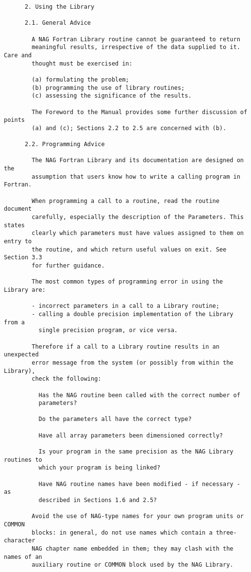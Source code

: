 \begin{small}
\begin{verbatim}
      2. Using the Library

      2.1. General Advice

        A NAG Fortran Library routine cannot be guaranteed to return
        meaningful results, irrespective of the data supplied to it. Care and
        thought must be exercised in:

        (a) formulating the problem;
        (b) programming the use of library routines;
        (c) assessing the significance of the results.

        The Foreword to the Manual provides some further discussion of points
        (a) and (c); Sections 2.2 to 2.5 are concerned with (b).

      2.2. Programming Advice

        The NAG Fortran Library and its documentation are designed on the
        assumption that users know how to write a calling program in Fortran.

        When programming a call to a routine, read the routine document
        carefully, especially the description of the Parameters. This states
        clearly which parameters must have values assigned to them on entry to
        the routine, and which return useful values on exit. See Section 3.3
        for further guidance.

        The most common types of programming error in using the Library are:

        - incorrect parameters in a call to a Library routine;
        - calling a double precision implementation of the Library from a
          single precision program, or vice versa.

        Therefore if a call to a Library routine results in an unexpected
        error message from the system (or possibly from within the Library),
        check the following:

          Has the NAG routine been called with the correct number of
          parameters?

          Do the parameters all have the correct type?

          Have all array parameters been dimensioned correctly?

          Is your program in the same precision as the NAG Library routines to
          which your program is being linked?

          Have NAG routine names have been modified - if necessary - as
          described in Sections 1.6 and 2.5?

        Avoid the use of NAG-type names for your own program units or COMMON
        blocks: in general, do not use names which contain a three-character
        NAG chapter name embedded in them; they may clash with the names of an
        auxiliary routine or COMMON block used by the NAG Library.


\end{verbatim}
\end{small}
